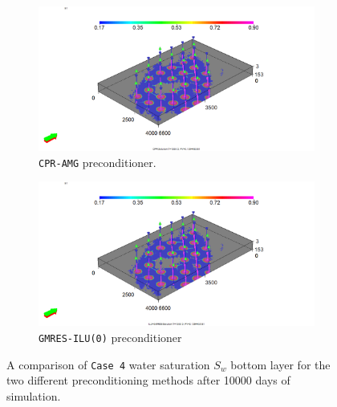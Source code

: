 \begin{figure}
\centering
\begin{subfigure}{.5\textwidth}
  \centering
  \includegraphics[width=1.3\linewidth]{figures/Case8_CPR_Sw_bl.png}
  \caption{\texttt{CPR-AMG} preconditioner.}
\end{subfigure}%
\begin{subfigure}{.5\textwidth}
  \centering
  \includegraphics[width=1.3\linewidth]{figures/Case8_ILU-GMRES_Sw_bl.png}
  \caption{\texttt{GMRES-ILU(0)} preconditioner}
\end{subfigure}
\caption{A comparison of \texttt{Case 4} water saturation $S_{w}$ bottom layer for the two different preconditioning methods after 10000 days of simulation.}
\label{case8swbl}
\end{figure}

